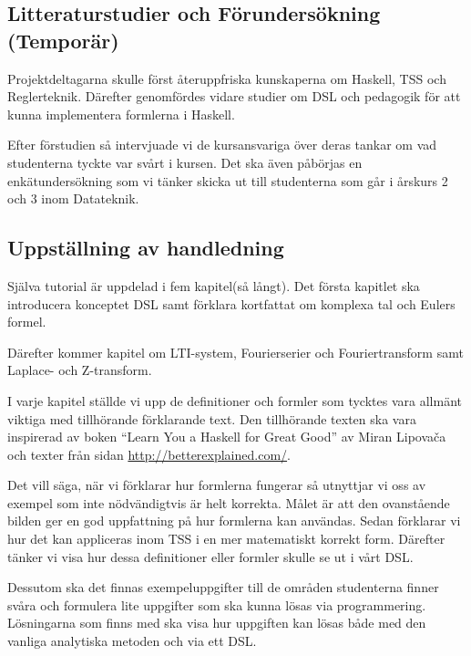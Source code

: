 \documentclass[]{article}
\begin{document}
\subsection{Litteraturstudier och Förundersökning (Temporär)}


Projektdeltagarna skulle först återuppfriska kunskaperna om Haskell, TSS
och Reglerteknik. Därefter genomfördes vidare studier om DSL och pedagogik för
att kunna implementera formlerna i Haskell.

Efter förstudien så intervjuade vi de kursansvariga över deras tankar om vad
studenterna tyckte var svårt i kursen. Det ska även påbörjas en enkätundersökning
som vi tänker skicka ut till studenterna som går i årskurs 2 och 3 inom Datateknik.


\subsection{Uppställning av handledning}

Själva tutorial är uppdelad i fem kapitel(så långt). Det första kapitlet
ska introducera konceptet DSL samt förklara kortfattat om komplexa tal
och Eulers formel.

Därefter kommer kapitel om LTI-system, Fourierserier och Fouriertransform
samt Laplace- och Z-transform.

I varje kapitel ställde vi upp de definitioner och formler som tycktes
vara allmänt viktiga med tillhörande förklarande text. Den tillhörande
texten ska vara inspirerad av boken ``Learn You a Haskell for Great
Good'' av Miran Lipovača \cite{learnyouahaskell} och texter från sidan
\url{http://betterexplained.com/}.

Det vill säga, när vi förklarar hur formlerna fungerar så utnyttjar vi
oss av exempel som inte nödvändigtvis är helt korrekta. Målet är
att den ovanstående bilden ger en god uppfattning på hur formlerna kan användas.
Sedan förklarar vi hur det kan appliceras inom TSS i en mer matematiskt korrekt form.
Därefter tänker vi visa hur dessa definitioner eller formler skulle se ut i vårt DSL.

Dessutom ska det finnas exempeluppgifter till de områden studenterna finner
svåra och formulera lite uppgifter som ska kunna lösas via programmering.
Lösningarna som finns med ska visa hur uppgiften kan lösas både med den vanliga
analytiska metoden och via ett DSL.
\end{document}
